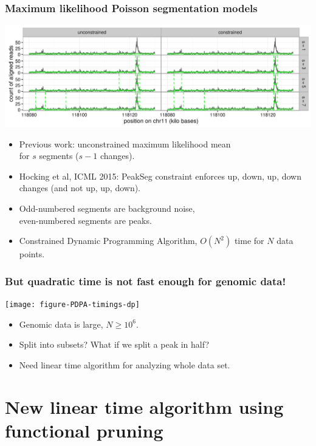 \documentclass{beamer}
\begin{document}
\begin{frame}
  \frametitle{Maximum likelihood Poisson segmentation models}
  \includegraphics[width=1\textwidth]{figure-Segmentor-PeakSeg}

  \begin{itemize}
  \item Previous work: unconstrained maximum likelihood mean\\
    for $s$ segments ($s-1$ changes).
  \item Hocking et al, ICML 2015: PeakSeg constraint enforces up, down, up,
    down changes (and not up, up, down). 
  \item Odd-numbered segments are background noise,\\
    even-numbered segments are peaks.
  \item Constrained Dynamic Programming Algorithm, $O(N^2)$ time for $N$ data points.
  \end{itemize}
\end{frame}

\begin{frame}
  \frametitle{But quadratic time is not fast enough for genomic data!}
  \texttt{[image: figure-PDPA-timings-dp]}
  \begin{itemize}
  \item Genomic data is large, $N \geq 10^6$.
  \item Split into subsets? What if we split a peak in half?
  \item Need linear time algorithm for analyzing whole data set.
  \end{itemize}
\end{frame}

\section{New linear time algorithm using functional pruning}
\end{document}
